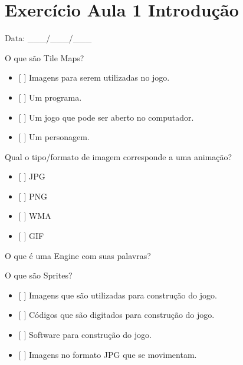 \documentclass[letterpaper,10pt,brazil]{sphinxmanual}
\begin{document}
\newpage


\section{Exercício Aula 1 \sphinxhyphen{} Introdução}
\label{\detokenize{modelo_aula_01:exercicio-aula-1-introducao}}
\sphinxAtStartPar
Data: \_\_\_/\_\_\_/\_\_\_

\sphinxAtStartPar
{}

 \sphinxhyphen{} O que são Tile Maps?
\begin{itemize}
\item {} 
\sphinxAtStartPar
{[}  {]} Imagens para serem utilizadas no jogo.

\item {} 
\sphinxAtStartPar
{[}  {]} Um programa.

\item {} 
\sphinxAtStartPar
{[}  {]} Um jogo que pode ser aberto no computador.

\item {} 
\sphinxAtStartPar
{[}  {]} Um personagem.

\end{itemize}

 \textendash{} Qual o tipo/formato de imagem corresponde a uma animação?
\begin{itemize}
\item {} 
\sphinxAtStartPar
{[}  {]} JPG

\item {} 
\sphinxAtStartPar
{[}  {]} PNG

\item {} 
\sphinxAtStartPar
{[}  {]} WMA

\item {} 
\sphinxAtStartPar
{[}  {]} GIF

\end{itemize}

 \textendash{} O que é uma Engine com suas palavras?

 \sphinxhyphen{} O que são Sprites?
\begin{itemize}
\item {} 
\sphinxAtStartPar
{[}  {]} Imagens que são utilizadas para construção do jogo.

\item {} 
\sphinxAtStartPar
{[}  {]} Códigos que são digitados para construção do jogo.

\item {} 
\sphinxAtStartPar
{[}  {]} Software para construção do jogo.

\item {} 
\sphinxAtStartPar
{[}  {]} Imagens no formato JPG que se movimentam.

\end{itemize}
\end{document}
